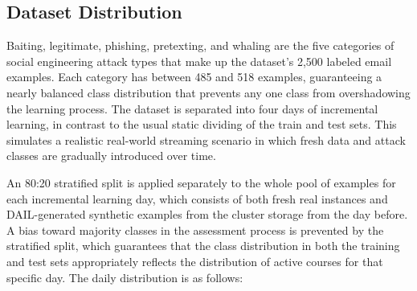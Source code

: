 \subsection{Dataset Distribution} 
Baiting, legitimate, phishing, pretexting, and whaling are the five categories of social engineering attack types that make up the dataset's 2,500 labeled email examples. Each category has between 485 and 518 examples, guaranteeing a nearly balanced class distribution that prevents any one class from overshadowing the learning process. The dataset is separated into four days of incremental learning, in contrast to the usual static dividing of the train and test sets. This simulates a realistic real-world streaming scenario in which fresh data and attack classes are gradually introduced over time.

An 80:20 stratified split is applied separately to the whole pool of examples for each incremental learning day, which consists of both fresh real instances and DAIL-generated synthetic examples from the cluster storage from the day before. A bias toward majority classes in the assessment process is prevented by the stratified split, which guarantees that the class distribution in both the training and test sets appropriately reflects the distribution of active courses for that specific day. The daily distribution is as follows:

\begin{table}[h]
\centering
\caption{Dataset Distribution}
\label{tab:dataset_distribution}
\end{table}


